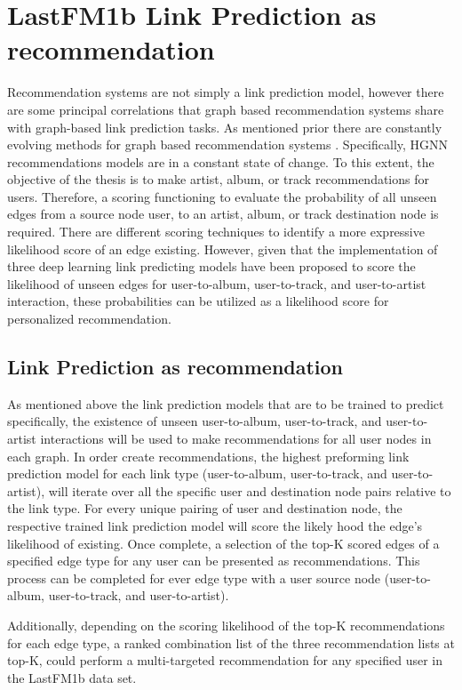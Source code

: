 

\section{LastFM1b Link Prediction as recommendation}

Recommendation systems are not simply a link prediction model, however there are some principal correlations that graph based recommendation systems share with graph-based link prediction tasks. As mentioned prior there are constantly evolving methods for graph based recommendation systems \cite{Gao2021}. Specifically, HGNN recommendations models are in a constant state of change. To this extent, the objective of the thesis is to make artist, album, or track recommendations for users. Therefore, a scoring functioning to evaluate the probability of all unseen edges from a source node user, to an artist, album, or track destination node is required. There are different scoring techniques to identify a more expressive likelihood score of an edge existing.\cite{Kumar20} However, given that the implementation of three deep learning link predicting models have been proposed to score the likelihood of unseen edges for user-to-album, user-to-track, and user-to-artist interaction, these probabilities can be utilized as a likelihood score for personalized recommendation.


\subsection{Link Prediction as recommendation}

As mentioned above the link prediction models that are to be trained to predict specifically, the existence of unseen user-to-album, user-to-track, and user-to-artist interactions will be used to make recommendations for all user nodes in each graph. In order create recommendations, the highest preforming link prediction model for each link type (user-to-album, user-to-track, and user-to-artist), will iterate over all the specific user and destination node pairs relative to the link type. For every unique pairing of user and destination node, the respective trained link prediction model will score the likely hood the edge's likelihood of existing. Once complete, a selection of the top-K scored edges of a specified edge type for any user can be presented as recommendations. This process can be completed for ever edge type with a user source node (user-to-album, user-to-track, and user-to-artist).

Additionally, depending on the scoring likelihood of the top-K recommendations for each edge type, a ranked combination list of the three recommendation lists at top-K, could perform a multi-targeted recommendation for any specified user in the LastFM1b data set.
